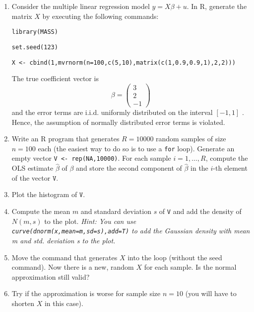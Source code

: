 \documentclass{article}
\begin{document}
\begin{enumerate}
\item Consider the multiple linear regression model $y=X\beta +u$. In R,
generate the matrix $X$ by executing the following commands:

\texttt{library(MASS)}

\texttt{set.seed(123)}

\texttt{X <-
cbind(1,mvrnorm(n=100,c(5,10),matrix(c(1,0.9,0.9,1),2,2)))}

The true coefficient vector is
\begin{equation*}
\beta =\left(
\begin{array}{c}
3 \\
2 \\
-1%
\end{array}%
\right)
\end{equation*}%
and the error terms are i.i.d. uniformly distributed on the interval $[-1,1]$%
. Hence, the assumption of normally distributed error terms is violated.

\item Write an R program that generates $R=10000$ random samples of size $%
n=100$ each (the easiest way to do so is to use a \texttt{for} loop).
Generate an empty vector \texttt{V <- rep(NA,10000)}. For each
sample $i=1,\ldots ,R$, compute the OLS estimate $\hat{\beta}$ of $\beta $
and store the second component of $\hat{\beta}$ in the $i$-th element of the
vector $\mathtt{V}$.

\item Plot the histogram of $\mathtt{V}$.

\item Compute the mean $m$ and standard deviation $s$ of \texttt{V} and add
the density of $N(m,s)$ to the plot. \emph{Hint: You can use \texttt{curve(dnorm(x,mean=m,sd=s),add=T)} to add the Gaussian density with mean m and std. deviation s to the plot.}

\item Move the command that generates $X$ into the loop (without the seed
command). Now there is a new, random $X$ for each sample. Is the normal
approximation still valid?

\item Try if the approximation is worse for sample size $n=10$ (you will
have to shorten $X$ in this case).
\end{enumerate}
\end{document}
